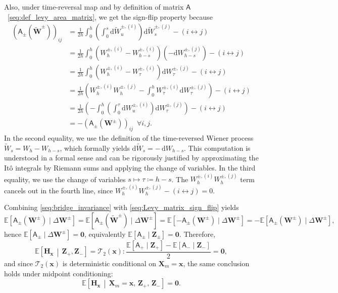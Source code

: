 \documentclass[
 longbibliography,
 twocolumn,
 superscriptaddress,
 amsmath,
 amssymb,
 amsthm,
 amsfonts,
 prl,
 floatfix,
]{revtex4-2}
\newcommand{\matbf}[1]{\boldsymbol{\mathsf{#1}}}
\begin{document}
\begin{widetext}
Also, under time-reversal map and by definition of matrix $\matbf{A}$~\eqref{seq:def_levy_area_matrix}, we get the sign-flip property because
\begin{equation}
    \begin{aligned}
        \left(\matbf{A}_\pm\left(\widetilde{\bm{W}}^\pm\right)\right)_{ij}
    &=\frac{1}{2h}\int_0^h\left(
    \int_0^s \mathrm{d}\widetilde{W}^{\pm,(i)}_u
    \right)\mathrm{d}\widetilde{W}^{\pm,(j)}_s
    -(i\leftrightarrow j)
    \\
    &=\frac{1}{2h}\int_0^h\left(
    W_h^{\pm,(i)}-W_{h-s}^{\pm,(i)}
    \right)\left(
    -\mathrm{d}W_{h-s}^{\pm,(j)}\right)
    -(i\leftrightarrow j)
    \\
    &=\frac{1}{2h}\int_0^h\left(
    W_h^{\pm,(i)}-W_\tau^{\pm,(i)}
    \right)
    \mathrm{d}W_\tau^{\pm,(j)}
    -(i\leftrightarrow j)
    \\
    &=\frac{1}{2h}\left(W_h^{\pm,(i)}W_h^{\pm,(j)}-\int_0^h
    W_\tau^{\pm,(i)}\mathrm{d}W_\tau^{\pm,(j)}\right)
    -(i\leftrightarrow j)
    \\
    &=\frac{1}{2h}\left(-
    \int_0^h\left(\int_0^\tau
    \mathrm{d}W_u^{\pm,(i)}
    \right)\mathrm{d}W_\tau^{\pm,(j)}
    \right)-(i\leftrightarrow j)
    \\
    &=-\left(\matbf{A}_\pm\left(\bm{W}^\pm\right)\right)_{ij} \,\,\,\forall i,j.
    \end{aligned}
    \label{seq:Levy_matrix_sign_flip}
\end{equation}
In the second equality, we use the definition of the time-reversed Wiener
process \(\widetilde W_s = W_h - W_{h-s}\), which formally yields
\(\mathrm{d}\widetilde W_s = -\,\mathrm{d}W_{h-s}\).
This computation is understood in a formal sense and can be rigorously
justified by approximating the It\^{o} integrals by Riemann sums and applying the change of variables.
In the third equality, we use the change of variables
\(s \mapsto \tau \coloneq h-s\). The $W_h^{\pm,(i)}W_h^{\pm,(j)}$ term cancels out in the fourth line, since $W_h^{\pm,(i)}W_h^{\pm,(j)}-(i\leftrightarrow j)=0$.

Combining \eqref{seq:bridge_invariance} with \eqref{seq:Levy_matrix_sign_flip} yields
\[
\mathbb E[\matbf A_\pm(\bm W^\pm)\mid \Delta\bm W^\pm]
=\mathbb E[\matbf A_\pm(\widetilde{\bm W}^\pm)\mid \Delta\bm W^\pm]
=\mathbb E[-\matbf A_\pm(\bm W^\pm)\mid \Delta\bm W^\pm]
=-\mathbb E[\matbf A_\pm(\bm W^\pm)\mid \Delta\bm W^\pm],
\]
hence $\mathbb E[\matbf A_\pm\mid \Delta\bm W^\pm]=\bm 0$, equivalently $\mathbb E[\matbf A_\pm\mid \bm Z_\pm]=\bm 0.$ 
Therefore,
\begin{equation*}
    \mathbb{E}\!\left[
    \bm{H}_{\bm{x}}\,\middle|\,\bm{Z}_+,\bm{Z}_-\right]
    = \mathcal{T}_2(\bm x):
    \frac{\mathbb E[\matbf A_+\mid \bm Z_+]-\mathbb E[\matbf A_-\mid \bm Z_-]}{2}=\bm 0,
\end{equation*}
and since $\mathcal T_2(\bm x)$ is deterministic conditional on $\bm X_m=\bm x$, the same conclusion holds under midpoint conditioning:
\begin{equation}
    \mathbb E\!\left[\bm H_{\bm x}\,\middle|\,\bm X_m=\bm x,\,\bm Z_+,\,\bm Z_-\right]=\bm 0.
    \label{seq:H_cond_mean_zero}
\end{equation}


\end{widetext}
\end{document}
